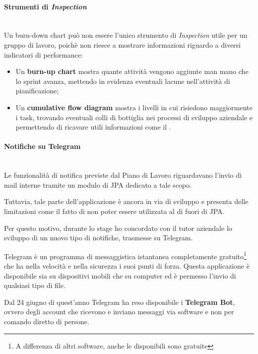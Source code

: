 \paragraph{Strumenti di \emph{Inspection}} \mbox{} \\

Un burn-down chart può non essere l'unico strumento di \emph{Inspection} utile
per un gruppo di lavoro, poichè non riesce a mostrare informazioni riguardo a
diversi indicatori di performance:

\begin{itemize}
\item Un \textbf{burn-up chart} mostra quante attività vengono aggiunte man
  mano che lo sprint avanza, mettendo in evidenza eventuali lacune
  nell'attività di pianificazione;
\item Un \textbf{cumulative flow diagram} mostra i livelli in cui risiedono
  maggiormente i task, trovando eventuali colli di bottiglia nei processi di
  sviluppo aziendale e permettendo di ricavare utili informazioni come il
  .
\end{itemize}

\paragraph{Notifiche su Telegram} \mbox{} \\

Le funzionalità di notifica previste dal Piano di Lavoro riguardavano l'invio
di mail interne tramite un modulo di JPA dedicato a tale scopo.

Tuttavia, tale parte dell'applicazione è ancora in via di sviluppo e presenta
delle limitazioni come il fatto di non poter essere utilizzata al di fuori di
JPA.

Per questo motivo, durante lo stage ho concordato con il tutor aziendale lo
sviluppo di un nuovo tipo di notifiche, trasmesse su Telegram.

Telegram è un programma di messaggistica istantanea completamente
gratuito\footnote{A differenza di altri software, anche le 
disponibili sono gratuite} che ha nella velocità e nella sicurezza i suoi
punti di forza. Questa applicazione è disponibile sia su dispositivi mobili
che su computer ed è permesso l'invio di qualsiasi tipo di file.

Dal 24 giugno di quest'anno Telegram ha reso disponibile i \textbf{Telegram
Bot}, ovvero degli account che ricevono e inviano messaggi via software e non
per comando diretto di persone.

